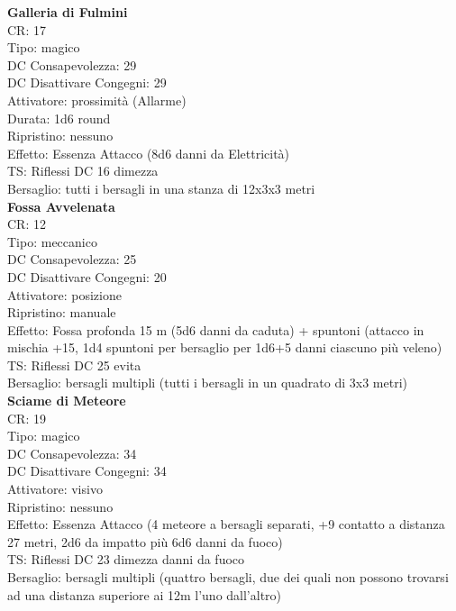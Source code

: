 \documentclass[a4paper,11pt,twoside,openany]{book}
\begin{document}
\begin{multicols}{2}
	\textbf{Galleria di Fulmini}\\
	CR: 17 \\
	Tipo: magico \\
	DC Consapevolezza: 29 \\
	DC Disattivare Congegni: 29 \\
	Attivatore: prossimità (Allarme) \\
	Durata: 1d6 round \\
	Ripristino: nessuno \\
	Effetto: Essenza Attacco (8d6 danni da Elettricità) \\
	TS: Riflessi DC 16 dimezza \\
	Bersaglio: tutti i bersagli in una stanza di 12x3x3 metri\\

	\textbf{Fossa Avvelenata}\\
	CR: 12 \\
	Tipo: meccanico \\
	DC Consapevolezza: 25 \\
	DC Disattivare Congegni: 20 \\
	Attivatore: posizione \\
	Ripristino: manuale \\
	Effetto: Fossa profonda 15 m (5d6 danni da caduta) + spuntoni (attacco in mischia +15, 1d4 spuntoni per bersaglio per 1d6+5 danni ciascuno più veleno)\\
	TS: Riflessi DC 25 evita \\
	Bersaglio: bersagli multipli (tutti i bersagli in un quadrato di 3x3 metri)\\

	\textbf{Sciame di Meteore}\\
	CR: 19 \\
	Tipo: magico \\
	DC Consapevolezza: 34 \\
	DC Disattivare Congegni: 34 \\
	Attivatore: visivo\\
	Ripristino: nessuno \\
	Effetto: Essenza Attacco (4 meteore a bersagli separati, +9 contatto a distanza 27 metri, 2d6 da impatto più 6d6 danni da fuoco)\\
	TS: Riflessi DC 23 dimezza danni da fuoco\\
	Bersaglio: bersagli multipli (quattro bersagli, due dei quali non possono trovarsi ad una distanza superiore ai 12m l’uno dall’altro)\\


\end{multicols}
\end{document}
